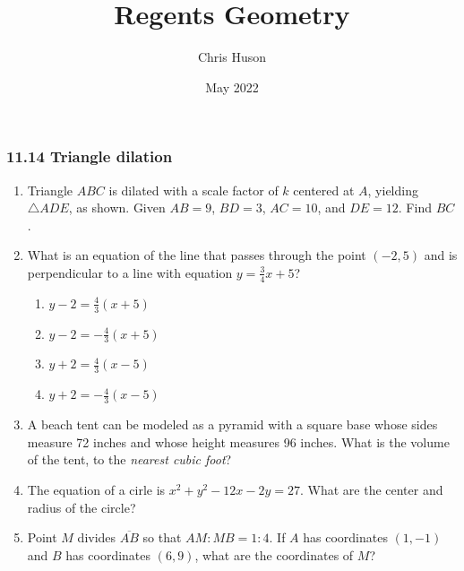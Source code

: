 \documentclass[12pt, oneside]{article}
\title{Regents Geometry}
\author{Chris Huson}
\date{May 2022}
\begin{document}
\subsubsection*{11.14 Triangle dilation}
\begin{enumerate}[itemsep=1.2cm]
    \item Triangle $ABC$ is dilated with a scale factor of $k$ centered at $A$, yielding $\triangle ADE$, as shown. Given $AB=9$, $BD=3$, $AC=10$, and $DE=12$. Find $BC$.
    \begin{center}
    \end{center}

\item What is an equation of the line that passes through the point $(-2,5)$ and is perpendicular to a line with equation $y=\frac{3}{4}x+5$?
    \begin{multicols}{2}
    \begin{enumerate}
        \item $y-2=\frac{4}{3}(x+5)$
        \item $y-2=-\frac{4}{3}(x+5)$ 
        \item $y+2=\frac{4}{3}(x-5)$
        \item $y+2=-\frac{4}{3}(x-5)$
    \end{enumerate}
    \end{multicols}


\item A beach tent can be modeled as a pyramid with a square base whose sides measure 72 inches and whose height measures 96 inches. What is the volume of the tent, to the \emph{nearest cubic foot}?

\item The equation of a cirle is $x^2+y^2-12x-2y=27$. What are the center and radius of the circle?

\item Point $M$ divides $\overline{AB}$ so that $AM:MB = 1:4$. If $A$ has coordinates $(1,-1)$ and $B$ has coordinates $(6,9)$, what are the coordinates of $M$?


\end{enumerate}
\end{document}
